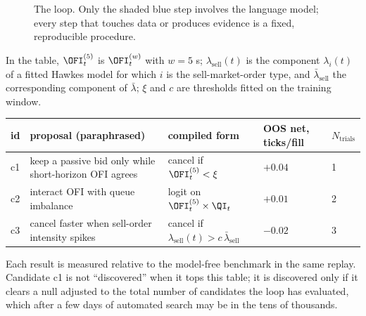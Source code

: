 \begin{figure}[ht]
\centering
{}
\caption{The \lamd{} loop. Only the shaded blue step involves the language model; every step that
touches data or produces evidence is a fixed, reproducible procedure.}
\label{fig:lamd}
\end{figure}

\begin{example}
In the table, $\OFI^{(5)}_t$ is $\OFI^{(w)}_t$ with $w = 5$ s; $\lambda_{\text{sell}}(t)$ is the
component $\lambda_i(t)$ of a fitted Hawkes model for which $i$ is the sell-market-order type, and
$\bar\lambda_{\text{sell}}$ the corresponding component of $\bar\lambda$; $\xi$ and $c$ are
thresholds fitted on the training window.
\begin{center}\small
\begin{tabularx}{\linewidth}{lXlll}
\toprule
id & proposal (paraphrased) & compiled form & OOS net, ticks/fill & $N_{\text{trials}}$ \\
\midrule
c1 & keep a passive bid only while short-horizon OFI agrees & cancel if $\OFI^{(5)}_t < \xi$ & $+0.04$ & 1 \\
c2 & interact OFI with queue imbalance & logit on $\OFI^{(5)}_t \times \QI_t$ & $+0.01$ & 2 \\
c3 & cancel faster when sell-order intensity spikes & cancel if $\lambda_{\text{sell}}(t) > c\,\bar\lambda_{\text{sell}}$ & $-0.02$ & 3 \\
\bottomrule
\end{tabularx}
\end{center}
Each result is measured relative to the model-free benchmark in the same replay. Candidate c1 is
not ``discovered'' when it tops this table; it is discovered only if it clears a null adjusted to
the total number of candidates the loop has evaluated, which after a few days of automated search
may be in the tens of thousands.
\end{example}

